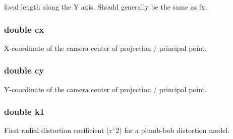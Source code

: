 focal length along the Y axis. Should generally be the same as {\ttfamily fx}. \hypertarget{structfovis_1_1CameraIntrinsicsParameters_ac176cb816ac192bd8ec2f73c40b43309}{
\subsubsection[{cx}]{\setlength{\rightskip}{0pt plus 5cm}double {\bf cx}}}
\label{structfovis_1_1CameraIntrinsicsParameters_ac176cb816ac192bd8ec2f73c40b43309}
X-\/coordinate of the camera center of projection / principal point. \hypertarget{structfovis_1_1CameraIntrinsicsParameters_a2d6a093e4a6fe06658d3d01563d028c9}{
\subsubsection[{cy}]{\setlength{\rightskip}{0pt plus 5cm}double {\bf cy}}}
\label{structfovis_1_1CameraIntrinsicsParameters_a2d6a093e4a6fe06658d3d01563d028c9}
Y-\/coordinate of the camera center of projection / principal point. \hypertarget{structfovis_1_1CameraIntrinsicsParameters_a830ffdbe06791ff8f55f8070464e5023}{
\subsubsection[{k1}]{\setlength{\rightskip}{0pt plus 5cm}double {\bf k1}}}
\label{structfovis_1_1CameraIntrinsicsParameters_a830ffdbe06791ff8f55f8070464e5023}
First radial distortion coefficient (r$^\wedge$2) for a plumb-\/bob distortion model.

